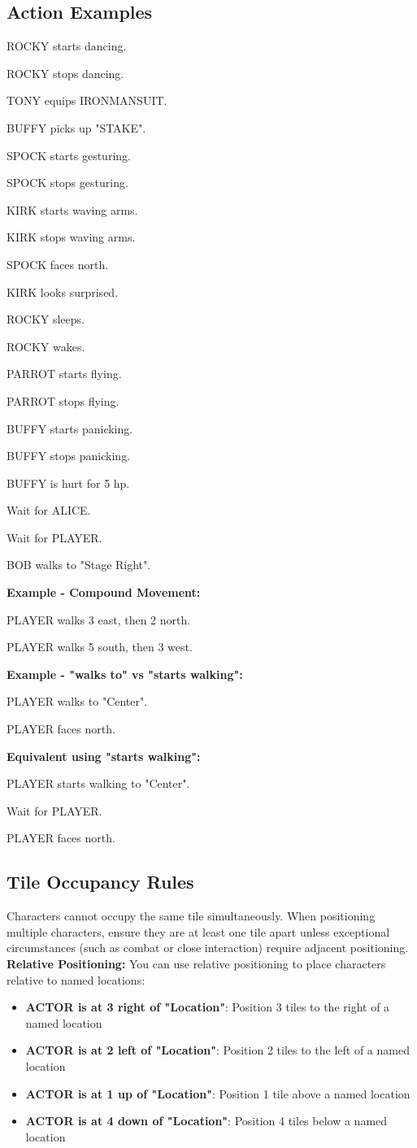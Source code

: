 \documentclass[11pt,letterpaper,oldstylefigures]{memoir}
\newcommand{\stagedir}[1]{#1\par\vspace{1\baselineskip}}
\newenvironment{FountainExample}
  {\begingroup
  \ttfamily\small
   \setlength{\parindent}{0pt}
  \setlength{\parskip}{0.5em}
  \allowdisplaybreaks
  \setlength{\displaywidowpenalty}{0}
  \setlength{\widowpenalty}{0}
  \setlength{\clubpenalty}{0}
  \setlength{\interlinepenalty}{0}
}
  {\endgroup}
\newcommand{\fountain}[1]{\textbf{#1}}
\begin{document}
\begin{FountainExample}
\subsection{Action Examples}

\begin{FountainExample}
\stagedir{ROCKY starts dancing.}
\stagedir{ROCKY stops dancing.}
\stagedir{TONY equips IRONMANSUIT.}
\stagedir{BUFFY picks up "STAKE".}
\stagedir{SPOCK starts gesturing.}
\stagedir{SPOCK stops gesturing.}
\stagedir{KIRK starts waving arms.}
\stagedir{KIRK stops waving arms.}
\stagedir{SPOCK faces north.}
\stagedir{KIRK looks surprised.}
\stagedir{ROCKY sleeps.}
\stagedir{ROCKY wakes.}
\stagedir{PARROT starts flying.}
\stagedir{PARROT stops flying.}
\stagedir{BUFFY starts panicking.}
\stagedir{BUFFY stops panicking.}
\stagedir{BUFFY is hurt for 5 hp.}
\end{FountainExample}
\stagedir{Wait for ALICE.}
\stagedir{Wait for PLAYER.}
\stagedir{BOB walks to "Stage Right".}
\end{FountainExample}

\textbf{Example - Compound Movement:}
\begin{FountainExample}
\stagedir{PLAYER walks 3 east, then 2 north.}
\stagedir{PLAYER walks 5 south, then 3 west.}
\end{FountainExample}

\textbf{Example - "walks to" vs "starts walking":}
\begin{FountainExample}
\stagedir{PLAYER walks to "Center".}
\stagedir{PLAYER faces north.}
\end{FountainExample}

\textbf{Equivalent using "starts walking":}
\begin{FountainExample}
\stagedir{PLAYER starts walking to "Center".}
\stagedir{Wait for PLAYER.}
\stagedir{PLAYER faces north.}
\end{FountainExample}
\subsection{Tile Occupancy Rules}

Characters cannot occupy the same tile simultaneously. When positioning multiple characters, ensure they are at least one tile apart unless exceptional circumstances (such as combat or close interaction) require adjacent positioning.
\textbf{Relative Positioning:}
You can use relative positioning to place characters relative to named locations:
\begin{itemize}
\item \fountain{ACTOR is at 3 right of "Location"}: Position 3 tiles to the right of a named location
\item \fountain{ACTOR is at 2 left of "Location"}: Position 2 tiles to the left of a named location
\item \fountain{ACTOR is at 1 up of "Location"}: Position 1 tile above a named location
\item \fountain{ACTOR is at 4 down of "Location"}: Position 4 tiles below a named location
\end{itemize}
\end{document}
